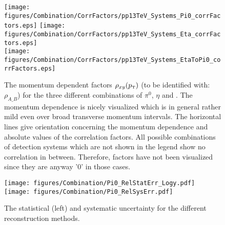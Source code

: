 %
 		\begin{figure}[h]
 			\centering
 			\texttt{[image: figures/Combination/CorrFactors/pp13TeV\_Systems\_Pi0\_corrFactors.eps]}
 			\texttt{[image: figures/Combination/CorrFactors/pp13TeV\_Systems\_Eta\_corrFactors.eps]}\\
 			\texttt{[image: figures/Combination/CorrFactors/pp13TeV\_Systems\_EtaToPi0\_corrFactors.eps]}
 			\caption{The momentum dependent factors $\rho_{xy}(p_{\text{\tiny T}})$ (to be identified with: $\rho_{A\_B}$) for the three different combinations of $\pi^0$, $\eta$ and \EtaToPi. The momentum dependence is nicely visualized which is in general rather mild even over broad transverse momentum intervals. The horizontal lines give orientation concerning the momentum dependence and absolute values of the correlation factors. All possible combinations of detection systems which are not shown in the legend show no correlation in between. Therefore, factors have not been visualized since they are anyway '0' in those cases.}
 			\label{fig:corrFactors}
 		\end{figure}

	\begin{figure}[h]
		\centering
		\texttt{[image: figures/Combination/Pi0\_RelStatErr\_Logy.pdf]}
		\texttt{[image: figures/Combination/Pi0\_RelSysErr.pdf]}\\

		\caption{The statistical (left) and systematic uncertainty for the different reconstruction methods.}
		\label{fig:combStatSysErr}
	\end{figure}
%
%
